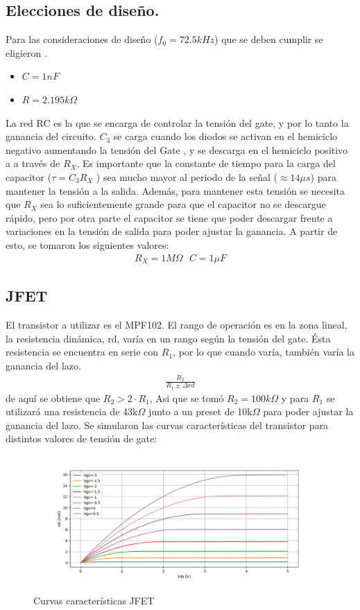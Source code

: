 \subsection{Elecciones de diseño.}
Para las consideraciones de diseño ($f_0 = 72.5 kHz$) que se deben cumplir se eligieron . \begin{itemize}
\item$C=1nF$
\item$R=2.195k\Omega$
\end{itemize} 

La red RC es la que se encarga de controlar la tensión del gate, y por lo tanto la ganancia del circuito. $C_3$ se carga cuando los diodos se activan en el hemiciclo negativo aumentando la tensión  del Gate , y se descarga en el hemiciclo positivo a a través de $R_X$. Es importante que la constante de tiempo para la carga del capacitor ($\tau=C_3R_X$ ) sea mucho mayor al periodo de la señal ($\approx 14\mu s$) para mantener la tensión a la salida. Además, para mantener esta tensión se necesita que $R_X$ sea lo suficientemente grande para que el capacitor no se descargue rápido, pero por otra parte el capacitor se tiene que poder descargar frente a variaciones en la
tensión de salida para poder ajustar la ganancia.
A partir de esto, se tomaron los siguientes valores:
\begin{align}
R_X=1M\Omega \ \ \ C=1\mu F
\end{align}

\subsection{JFET}
El transistor a utilizar es el MPF102. El rango de operación es en la zona lineal, la resistencia dinámica, rd, varía en un rango según la tensión del gate. Ésta resistencia se encuentra en
serie con $R_1$, por lo que cuando varía, también varía la ganancia del lazo.
\begin{align}
\frac{R_2}{R_1 \pm \Delta rd}
\end{align}
de aquí se obtiene que $R_2>2\cdot R_1$, Asi que se tomó $R_2=100k\Omega$ y para $R_1$ se utilizará una resistencia de 43k$\Omega$ junto a un preset de 10k$\Omega$ para poder ajustar la ganancia del lazo.
Se simularon las curvas características del transistor para distintos valores de tensión de gate:
\begin{figure}[H]
	\centering
	\includegraphics[width=\textwidth]{Imagenes-Ej1/curvasJfet.png}
	\label{fig:caracdcurv}
	\caption{Curvas características JFET}
\end{figure}

